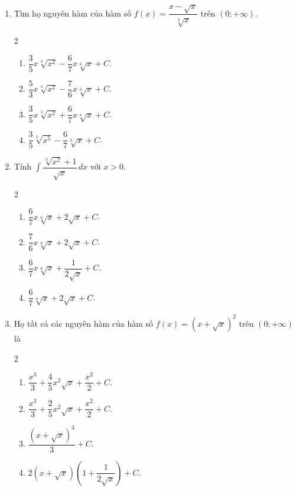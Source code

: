 \documentclass[12pt]{article}
\begin{document}
\begin{enumerate}[label=\textbf{Câu \arabic*.}]
		\item Tìm họ nguyên hàm của hàm số $f(x) = \dfrac{x - \sqrt{x}}{\sqrt[3]{x}}$ trên $(0; +\infty)$.
		\begin{multicols}{2}
			\begin{enumerate}[label=\textbf{\Alph*.}]
				\item $\dfrac{3}{5}x\sqrt[3]{x^2} - \dfrac{6}{7}x\sqrt[6]{x} + C$.
				\item $\dfrac{5}{3}x\sqrt[3]{x^2} - \dfrac{7}{6}x\sqrt[6]{x} + C$.
				\item $\dfrac{3}{5}x\sqrt[3]{x^2} + \dfrac{6}{7}x\sqrt[6]{x} + C$.
				\item $\dfrac{3}{5}\sqrt[3]{x^5} - \dfrac{6}{7}\sqrt[6]{x} + C$.
			\end{enumerate}
		\end{multicols}
		
		\item Tính $\displaystyle \int \dfrac{\sqrt[3]{x^2} + 1}{\sqrt{x}} \,dx$ với $x > 0$.
		\begin{multicols}{2}
			\begin{enumerate}[label=\textbf{\Alph*.}]
				\item $\dfrac{6}{7}x\sqrt[6]{x} + 2\sqrt{x} + C$.
				\item $\dfrac{7}{6}x\sqrt[6]{x} + 2\sqrt{x} + C$.
				\item $\dfrac{6}{7}x\sqrt[6]{x} + \dfrac{1}{2\sqrt{x}} + C$.
				\item $\dfrac{6}{7}\sqrt[6]{x} + 2\sqrt{x} + C$.
			\end{enumerate}
		\end{multicols}
		
		\item Họ tất cả các nguyên hàm của hàm số $f(x) = (x + \sqrt{x})^2$ trên $(0; +\infty)$ là
		\begin{multicols}{2}
			\begin{enumerate}[label=\textbf{\Alph*.}]
				\item $\dfrac{x^3}{3} + \dfrac{4}{5}x^2\sqrt{x} + \dfrac{x^2}{2} + C$.
				\item $\dfrac{x^3}{3} + \dfrac{2}{5}x^2\sqrt{x} + \dfrac{x^2}{2} + C$.
				\item $\dfrac{(x+\sqrt{x})^3}{3} + C$.
				\item $2(x + \sqrt{x})\left(1 + \dfrac{1}{2\sqrt{x}}\right) + C$.
			\end{enumerate}
		\end{multicols}
		

\end{enumerate}
\end{document}
